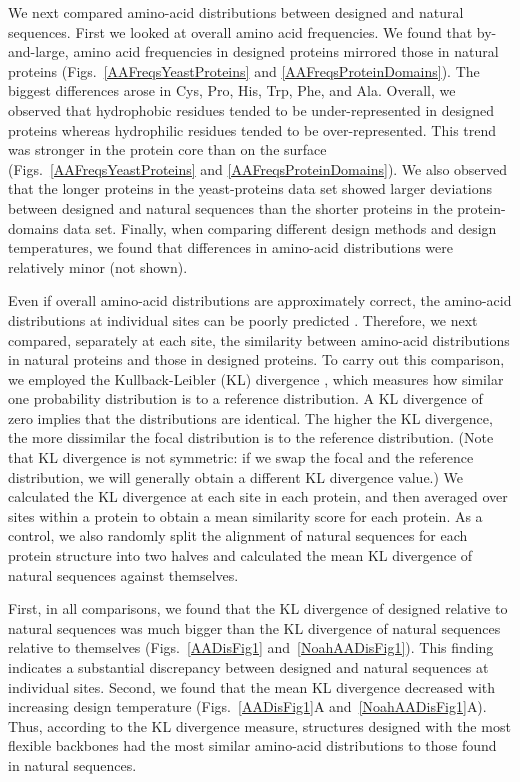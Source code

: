 \documentclass[12pt]{article}
\begin{document}
We next compared amino-acid distributions between designed and natural sequences. First we looked at overall amino acid frequencies. We found that by-and-large, amino acid frequencies in designed proteins mirrored those in natural proteins (Figs.~\ref{AAFreqsYeastProteins} and \ref{AAFreqsProteinDomains}). The biggest differences arose in Cys, Pro, His, Trp, Phe, and Ala. Overall, we observed that hydrophobic residues tended to be under-represented in designed proteins whereas hydrophilic residues tended to be over-represented. This trend was stronger in the protein core than on the surface (Figs.~\ref{AAFreqsYeastProteins} and \ref{AAFreqsProteinDomains}). We also observed that the longer proteins in the yeast-proteins data set showed larger deviations between designed and natural sequences than the shorter proteins in the protein-domains data set. Finally, when comparing different design methods and design temperatures, we found that differences in amino-acid distributions were relatively minor (not shown).

Even if overall amino-acid distributions are approximately correct, the amino-acid distributions at individual sites can be poorly predicted \citep{Ramsey2011}. Therefore, we next compared, separately at each site, the similarity between amino-acid distributions in natural proteins and those in designed proteins. To carry out this comparison, we employed the Kullback-Leibler (KL) divergence \citep{Wasserman2004}, which measures how similar one probability distribution is to a reference distribution. A KL divergence of zero implies that the distributions are identical. The higher the KL divergence, the more dissimilar the focal distribution is to the reference distribution. (Note that KL divergence is not symmetric: if we swap the focal and the reference distribution, we will generally obtain a different KL divergence value.) We calculated the KL divergence at each site in each protein, and then averaged over sites within a protein to obtain a mean similarity score for each protein. As a control, we also randomly split the alignment of natural sequences for each protein structure into two halves and calculated the mean KL divergence of natural sequences against themselves.

First, in all comparisons, we found that the KL divergence of designed relative to natural sequences was much bigger than the KL divergence of natural sequences relative to themselves (Figs.~\ref{AADisFig1} and~\ref{NoahAADisFig1}). This finding indicates a substantial discrepancy between designed and natural sequences at individual sites. Second, we found that the mean KL divergence decreased with increasing design temperature (Figs.~\ref{AADisFig1}A and~\ref{NoahAADisFig1}A). Thus, according to the KL divergence measure, structures designed with the most flexible backbones had the most similar amino-acid distributions to those found in natural sequences.
\end{document}
